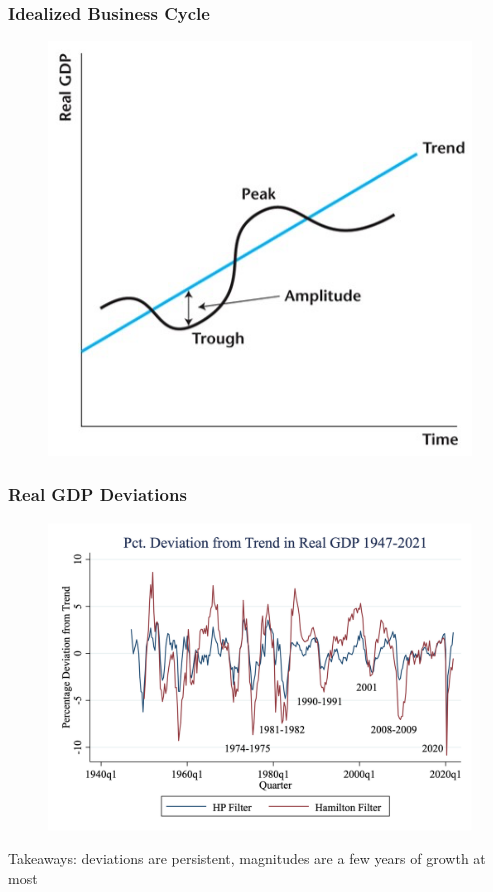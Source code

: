 \documentclass{beamer}
\begin{document}
\begin{frame}
\frametitle[alignment=center]{Idealized Business Cycle}
\begin{figure}
\centering
\includegraphics[scale=0.5]{Figures/W_Fig_3pt1.png}
\end{figure}
\end{frame}



\begin{frame}
\frametitle[alignment=center]{Real GDP Deviations}
\begin{figure}
\centering
\includegraphics[scale=0.25]{Figures/Fig_3pt2.png}
\end{figure}
Takeaways:  deviations are persistent, magnitudes are a few years of growth at most
\end{frame}
\end{document}
